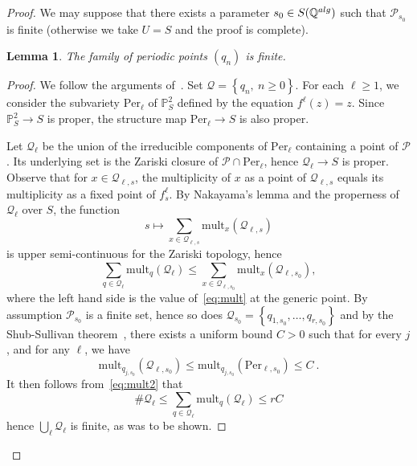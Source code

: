 \documentclass[11 pt, oneside, a4paper]{amsart}
\newcommand{\Q}{\mathbb{Q}}
\renewcommand{\P}{\mathbb{P}}
\newcommand{\set}[1]{{\left\{#1\right\}}}
\newtheorem{lem}[thm]{Lemma}
\theoremstyle{definition}
\theoremstyle{definition}
\begin{document}
\begin{proof}
We may suppose that there exists a parameter $s_0\in S(\Q^{\rm alg})$ such that $\mathcal P_{s_0}$ is finite (otherwise we take $U=S$ and the proof is complete). 

\begin{lem}
The family of periodic points $(q_n)$ is finite. 
\end{lem}

\begin{proof}
We follow the arguments of~\cite[\S 5]{DMM-henon}.
Set $\mathcal Q = \set{q_n, \ n\geq 0}$. 
For each $\ell\geq 1$, we consider the subvariety $\mathrm{Per}_\ell$ 
of $\P^2_S$ defined by the equation 
$f^\ell(z) = z$. 
Since $\P^2_S\to S$ is proper, the structure map $\mathrm{Per}_\ell \to S$ is also proper. 

Let $\mathcal Q_\ell$ be the union of the irreducible components of $\mathrm{Per}_\ell$ containing a point of 
$\mathcal P$. Its underlying set is  the Zariski closure of $\mathcal P\cap \mathrm{Per}_\ell$, hence
$\mathcal Q_\ell \to S$ is proper.
Observe that for $x\in \mathcal Q_{\ell, s}$, the multiplicity of $x$ as a point of 
$\mathcal Q_{\ell, s}$ equals 
 its multiplicity as a fixed point of $f_s^\ell$. 
By Nakayama's lemma and the properness of $\mathcal Q_\ell$ over $S$,
the function 
\begin{equation}\label{eq:mult}
 s\longmapsto \sum_{x\in \mathcal Q_{\ell, s}} \mathrm{mult}_x(\mathcal Q_{\ell, s})
\end{equation}
is   upper semi-continuous for the Zariski topology, hence 
\begin{equation}\label{eq:mult2}
\sum_{q\in \mathcal Q_\ell} \mathrm{mult}_q(\mathcal Q_\ell)
\leq
\sum_{x\in \mathcal Q_{\ell, s_0}} \mathrm{mult}_x(\mathcal Q_{\ell, s_0}),
\end{equation}
where the left hand side is the value of~\eqref{eq:mult} at the generic point.  
By assumption $\mathcal P_{s_0}$ is a finite set, hence so does 
$\mathcal Q_{s_0} = \set{q_{1, s_0}, \ldots , q_{r, s_0}}$ 
and by the Shub-Sullivan theorem~\cite{shub-sullivan}, there exists a uniform bound $C>0$
such that for every $j$, and for any $\ell$, we have
\[\mathrm{mult}_{q_{j,s_0} }(\mathcal Q_{\ell, s_0}) \leq \mathrm{mult}_{q_{j, s_0}}(\mathrm{Per}_{\ell, s_0}) \le C~.\]
It then follows from~\eqref{eq:mult2} that 
\[
\# \mathcal Q_\ell \le \sum_{q\in \mathcal Q_\ell} \mathrm{mult}_q(\mathcal Q_\ell)
\le r C\]
hence $\bigcup_\ell \mathcal Q_\ell$  is finite, 
   as was to be shown. 
\end{proof}


\end{proof}
\end{document}
